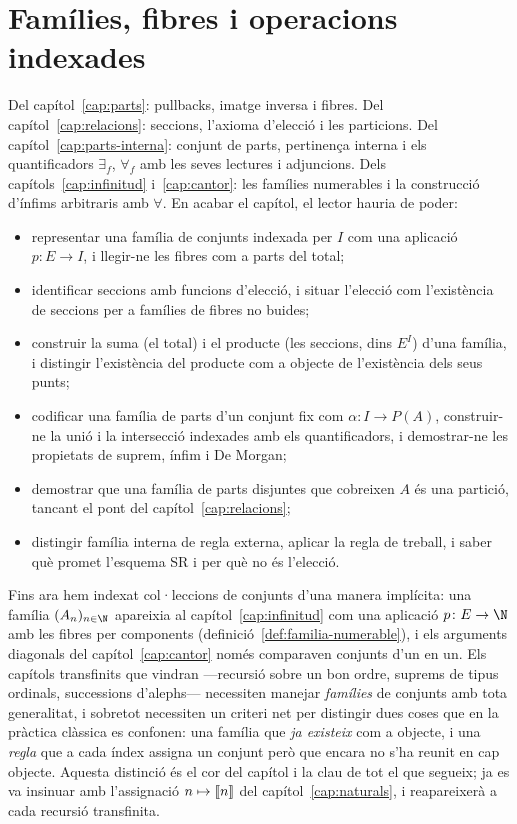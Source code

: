 \chapter{Famílies, fibres i operacions indexades}\label{cap:families}

\begin{objectius}
 Del capítol~\ref{cap:parts}: pullbacks, imatge inversa i fibres. Del capítol~\ref{cap:relacions}: seccions, l'axioma d'elecció i les particions. Del capítol~\ref{cap:parts-interna}: conjunt de parts, pertinença interna i els quantificadors \(\exists_f\), \(\forall_f\) amb les seves lectures i adjuncions. Dels capítols~\ref{cap:infinitud} i~\ref{cap:cantor}: les famílies numerables i la construcció d'ínfims arbitraris amb \(\forall\).
 En acabar el capítol, el lector hauria de poder:
\begin{itemize}
  \item representar una família de conjunts indexada per \(I\) com una aplicació \(p\colon E\to I\), i llegir-ne les fibres com a parts del total;
  \item identificar seccions amb funcions d'elecció, i situar l'elecció com l'existència de seccions per a famílies de fibres no buides;
  \item construir la suma (el total) i el producte (les seccions, dins \(E^I\)) d'una família, i distingir l'existència del producte com a objecte de l'existència dels seus punts;
  \item codificar una família de parts d'un conjunt fix com \(\alpha\colon I\to P(A)\), construir-ne la unió i la intersecció indexades amb els quantificadors, i demostrar-ne les propietats de suprem, ínfim i De Morgan;
  \item demostrar que una família de parts disjuntes que cobreixen \(A\) és una partició, tancant el pont del capítol~\ref{cap:relacions};
  \item distingir família interna de regla externa, aplicar la regla de treball, i saber què promet l'esquema SR i per què no és l'elecció.
\end{itemize}
\end{objectius}

Fins ara hem indexat col·leccions de conjunts d'una manera implícita: una
família \((A_n)_{n\in\N}\) apareixia al capítol~\ref{cap:infinitud} com una
aplicació \(p\colon E\to\N\) amb les fibres per components
(definició~\ref{def:familia-numerable}), i els arguments diagonals del
capítol~\ref{cap:cantor} només comparaven conjunts d'un en un. Els capítols
transfinits que vindran ---recursió sobre un bon ordre, suprems de tipus
ordinals, successions d'alephs--- necessiten manejar \emph{famílies} de
conjunts amb tota generalitat, i sobretot necessiten un criteri net per
distingir dues coses que en la pràctica clàssica es confonen: una família
que \emph{ja existeix} com a objecte, i una \emph{regla} que a cada índex
assigna un conjunt però que encara no s'ha reunit en cap objecte. Aquesta
distinció és el cor del capítol i la clau de tot el que segueix; ja es va
insinuar amb l'assignació \(n\mapsto\llbracket n\rrbracket\) del capítol~\ref{cap:naturals},
i reapareixerà a cada recursió transfinita.

